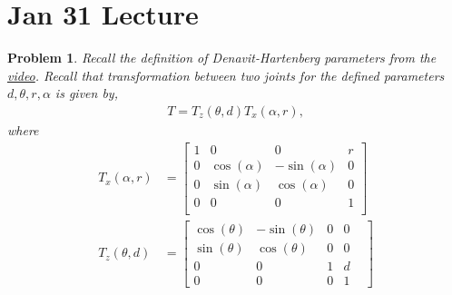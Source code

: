 \documentclass[twocolumn]{article}
\newtheorem{prob}{Problem}
\begin{document}
\section{Jan 31 Lecture}
\begin{prob}
  Recall the definition of Denavit-Hartenberg parameters from the
  \href{https://www.youtube.com/watch?v=rA9tm0gTln8}{video}. Recall that
  transformation between two joints for the defined parameters $d, \theta, r,
  \alpha$ is given by,
  \begin{align}
    T = T_z(\theta, d) T_x(\alpha, r),
  \end{align}
  where
  \begin{align}
    T_x(\alpha, r) &= \begin{bmatrix}
      1 & 0 & 0 & r \\
      0 & \cos(\alpha) & -\sin(\alpha) & 0 \\
      0 & \sin(\alpha) & \cos(\alpha) & 0 \\
      0 & 0 & 0 & 1 \\
      \end{bmatrix}
    \\
    T_z(\theta, d) &= \begin{bmatrix}
      \cos(\theta) & -\sin(\theta) & 0 &  0 \\
      \sin(\theta) & \cos(\theta) & 0  & 0 \\
      0 & 0 & 1 & d & \\
      0 & 0 & 0 & 1 &
    \end{bmatrix}
  \end{align}


\end{prob}
\end{document}
